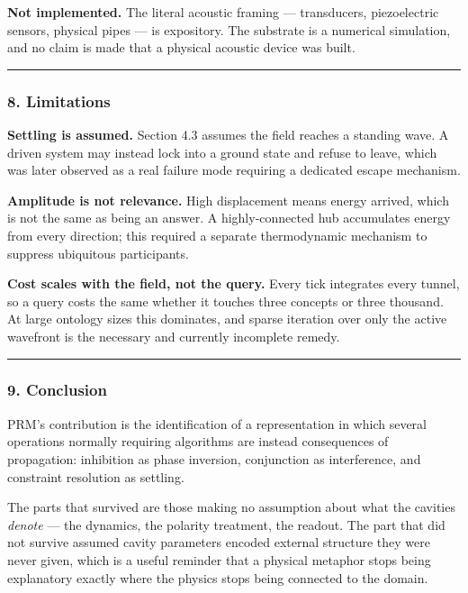 \documentclass[
  11pt,
  a4paper,
]{article}
\begin{document}
\textbf{Not implemented.} The literal acoustic framing --- transducers,
piezoelectric sensors, physical pipes --- is expository. The substrate
is a numerical simulation, and no claim is made that a physical acoustic
device was built.

\begin{center}\rule{0.5\linewidth}{0.5pt}\end{center}

\subsubsection{8. Limitations}\label{limitations}

\textbf{Settling is assumed.} Section 4.3 assumes the field reaches a
standing wave. A driven system may instead lock into a ground state and
refuse to leave, which was later observed as a real failure mode
requiring a dedicated escape mechanism.

\textbf{Amplitude is not relevance.} High displacement means energy
arrived, which is not the same as being an answer. A highly-connected
hub accumulates energy from every direction; this required a separate
thermodynamic mechanism to suppress ubiquitous participants.

\textbf{Cost scales with the field, not the query.} Every tick
integrates every tunnel, so a query costs the same whether it touches
three concepts or three thousand. At large ontology sizes this
dominates, and sparse iteration over only the active wavefront is the
necessary and currently incomplete remedy.

\begin{center}\rule{0.5\linewidth}{0.5pt}\end{center}

\subsubsection{9. Conclusion}\label{conclusion}

PRM's contribution is the identification of a representation in which
several operations normally requiring algorithms are instead
consequences of propagation: inhibition as phase inversion, conjunction
as interference, and constraint resolution as settling.

The parts that survived are those making no assumption about what the
cavities \emph{denote} --- the dynamics, the polarity treatment, the
readout. The part that did not survive assumed cavity parameters encoded
external structure they were never given, which is a useful reminder
that a physical metaphor stops being explanatory exactly where the
physics stops being connected to the domain.
\end{document}
